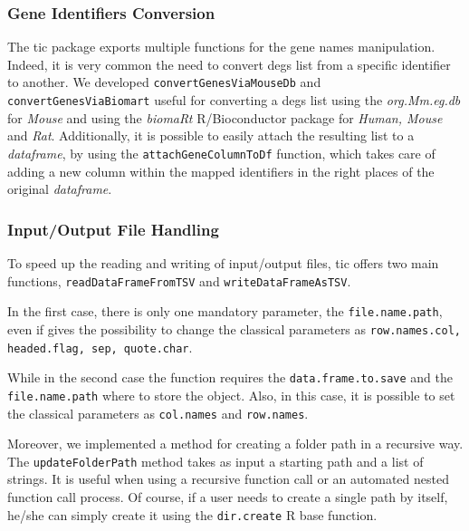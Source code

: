 \subsubsection{Gene Identifiers Conversion}

The \gls{tic} package exports multiple functions for the gene names manipulation. 
Indeed, it is very common the need to convert \glspl{deg} list from a specific identifier to another.
We developed \lstinline!convertGenesViaMouseDb! and \lstinline!convertGenesViaBiomart! useful for converting a \glspl{deg} list using the \textit{org.Mm.eg.db} \cite{Carlson2018} for \textit{Mouse} and using the \textit{biomaRt} R/Bioconductor package for \textit{Human, Mouse} and \textit{Rat}.
Additionally, it is possible to easily attach the resulting list to a \textit{dataframe}, by using the \lstinline!attachGeneColumnToDf! function, which takes care of adding a new column within the mapped identifiers in the right places of the original \textit{dataframe}.

\subsubsection{Input/Output File Handling}

To speed up the reading and writing of input/output files, \gls{tic} offers two main functions, \lstinline!readDataFrameFromTSV! and \lstinline!writeDataFrameAsTSV!.

In the first case, there is only one mandatory parameter, the \lstinline!file.name.path!, even if gives the possibility to change the classical parameters as \lstinline!row.names.col, headed.flag, sep, quote.char!.

While in the second case the function requires the \lstinline!data.frame.to.save! and the \lstinline!file.name.path! where to store the object. 
Also, in this case, it is possible to set the classical parameters as \lstinline!col.names! and \lstinline!row.names!.

Moreover, we implemented a method for creating a folder path in a recursive way.
The \lstinline!updateFolderPath! method takes as input a starting path and a list of strings. 
It is useful when using a recursive function call or an automated nested function call process.
Of course, if a user needs to create a single path by itself, he/she can simply create it using the \lstinline!dir.create! R base function.



















